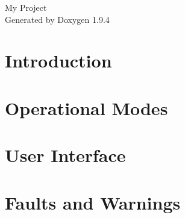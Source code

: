 \documentclass[twoside]{book}
\newcommand{\+}{\discretionary{\mbox{\scriptsize$\hookleftarrow$}}{}{}}
\newcommand{\clearemptydoublepage}{%
    \newpage{\pagestyle{empty}\cleardoublepage}%
  }
\begin{document}
  \raggedbottom
    \hypersetup{pageanchor=false,
                bookmarksnumbered=true,
                pdfencoding=unicode
               }
  \begin{titlepage}
  \vspace*{7cm}
  \begin{center}%
  {\Large My Project}\\
  \vspace*{1cm}
  {\large Generated by Doxygen 1.9.4}\\
  \end{center}
  \end{titlepage}
  \clearemptydoublepage
  \tableofcontents
  \clearemptydoublepage
  \hypersetup{pageanchor=true}
\chapter{Introduction}
\label{index}\hypertarget{index}{}
\chapter{Operational Modes}
\label{modes}

\chapter{User Interface}
\label{gui}

\chapter{Faults and Warnings}
\label{faults}

  \backmatter
  \newpage
  \clearemptydoublepage
  \printindex
\end{document}
